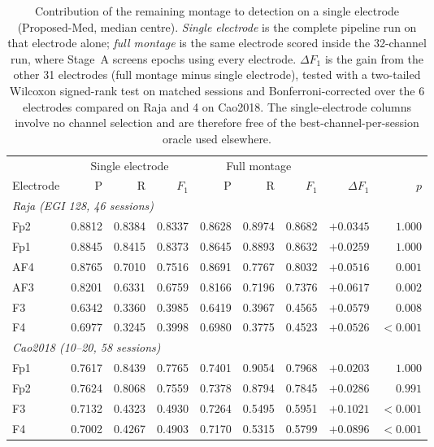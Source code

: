 \begin{table}[htbp]
\centering
\footnotesize
\setlength{\tabcolsep}{4pt}
\caption{Contribution of the remaining montage to detection on a single electrode (Proposed-Med, median centre). \emph{Single electrode} is the complete pipeline run on that electrode alone; \emph{full montage} is the same electrode scored inside the 32-channel run, where Stage~A screens epochs using every electrode. $\Delta F_1$ is the gain from the other 31 electrodes (full montage minus single electrode), tested with a two-tailed Wilcoxon signed-rank test on matched sessions and Bonferroni-corrected over the 6 electrodes compared on Raja and 4 on Cao2018. The single-electrode columns involve no channel selection and are therefore free of the best-channel-per-session oracle used elsewhere.}
\label{tab:exp1_solo_vs_montage}
\begin{tabular}{lrrrrrrrr}
\toprule
 & \multicolumn{3}{c}{Single electrode} & \multicolumn{3}{c}{Full montage} & & \\
\cmidrule(lr){2-4}\cmidrule(lr){5-7}
Electrode & P & R & $F_1$ & P & R & $F_1$ & $\Delta F_1$ & $p$ \\
\midrule
\multicolumn{9}{l}{\textit{Raja (EGI 128, 46 sessions)}} \\[2pt]
Fp2 & 0.8812 & 0.8384 & 0.8337 & 0.8628 & 0.8974 & 0.8682 & $+0.0345$ & $1.000$ \\
Fp1 & 0.8845 & 0.8415 & 0.8373 & 0.8645 & 0.8893 & 0.8632 & $+0.0259$ & $1.000$ \\
AF4 & 0.8765 & 0.7010 & 0.7516 & 0.8691 & 0.7767 & 0.8032 & $+0.0516$ & $0.001$ \\
AF3 & 0.8201 & 0.6331 & 0.6759 & 0.8166 & 0.7196 & 0.7376 & $+0.0617$ & $0.002$ \\
F3 & 0.6342 & 0.3360 & 0.3985 & 0.6419 & 0.3967 & 0.4565 & $+0.0579$ & $0.008$ \\
F4 & 0.6977 & 0.3245 & 0.3998 & 0.6980 & 0.3775 & 0.4523 & $+0.0526$ & $<0.001$ \\
\midrule
\multicolumn{9}{l}{\textit{Cao2018 (10--20, 58 sessions)}} \\[2pt]
Fp1 & 0.7617 & 0.8439 & 0.7765 & 0.7401 & 0.9054 & 0.7968 & $+0.0203$ & $1.000$ \\
Fp2 & 0.7624 & 0.8068 & 0.7559 & 0.7378 & 0.8794 & 0.7845 & $+0.0286$ & $0.991$ \\
F3 & 0.7132 & 0.4323 & 0.4930 & 0.7264 & 0.5495 & 0.5951 & $+0.1021$ & $<0.001$ \\
F4 & 0.7002 & 0.4267 & 0.4903 & 0.7170 & 0.5315 & 0.5799 & $+0.0896$ & $<0.001$ \\
\bottomrule
\end{tabular}
\end{table}
